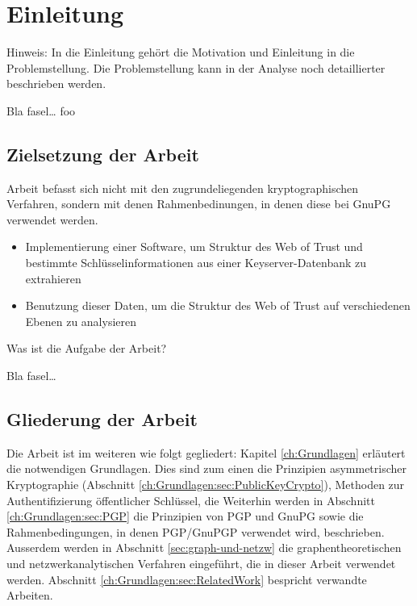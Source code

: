 
\chapter{Einleitung}
\label{ch:Einleitung}
Hinweis: In die Einleitung gehört die Motivation 
und Einleitung in die Problemstellung. Die Problemstellung
kann in der Analyse noch detaillierter beschrieben werden.

Bla fasel\ldots
foo


\section{Zielsetzung der Arbeit}
\label{ch:Einleitung:sec:Zielsetzung}

Arbeit befasst sich nicht mit den zugrundeliegenden kryptographischen
Verfahren, sondern mit denen Rahmenbedinungen, in denen diese bei
GnuPG verwendet werden.

\begin{itemize}
\item Implementierung einer Software, um Struktur des Web of Trust und
  bestimmte Schl\"usselinformationen aus einer Keyserver-Datenbank zu
  extrahieren
\item Benutzung dieser Daten, um die Struktur des Web of Trust auf
  verschiedenen Ebenen zu analysieren
\end{itemize}

Was ist die Aufgabe der Arbeit?

Bla fasel\ldots

\section{Gliederung der Arbeit}
\label{ch:Einleitung:sec:Gliederung}

Die Arbeit ist im weiteren wie folgt gegliedert: Kapitel
\ref{ch:Grundlagen} erl\"autert die notwendigen Grundlagen. Dies sind
zum einen die Prinzipien asymmetrischer Kryptographie (Abschnitt
\ref{ch:Grundlagen:sec:PublicKeyCrypto}), Methoden zur
Authentifizierung \"offentlicher Schl\"ussel, die Weiterhin werden in
Abschnitt \ref{ch:Grundlagen:sec:PGP} die Prinzipien von PGP und GnuPG
sowie die Rahmenbedingungen, in denen PGP/GnuPGP verwendet wird,
beschrieben. Ausserdem werden in Abschnitt \ref{sec:graph-und-netzw}
die graphentheoretischen und netzwerkanalytischen Verfahren
eingef\"uhrt, die in dieser Arbeit verwendet werden. Abschnitt
\ref{ch:Grundlagen:sec:RelatedWork} bespricht verwandte Arbeiten.

